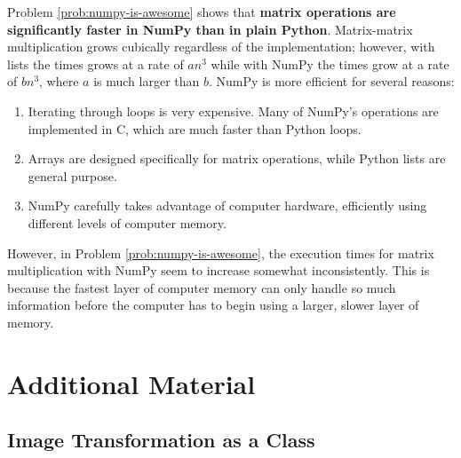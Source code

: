 \begin{info} %
Problem \ref{prob:numpy-is-awesome} shows that \textbf{matrix  operations are significantly faster in NumPy than in plain Python}.
Matrix-matrix multiplication grows cubically regardless of the implementation; however, with lists the times grows at a rate of $an^3$ while with NumPy the times grow at a rate of $bn^3$, where $a$ is much larger than $b$.
NumPy is more efficient for several reasons:
\begin{enumerate}
    \item Iterating through loops is very expensive.
    Many of NumPy's operations are implemented in C, which are much faster than Python loops.
    \item Arrays are designed specifically for matrix operations, while Python lists are general purpose.
    \item NumPy carefully takes advantage of computer hardware, efficiently using different levels of computer memory.
\end{enumerate}

However, in Problem \ref{prob:numpy-is-awesome}, the execution times for matrix multiplication with NumPy seem to increase somewhat inconsistently.
This is because the fastest layer of computer memory can only handle so much information before the computer has to begin using a larger, slower layer of memory.

\end{info}

\newpage

\section*{Additional Material} %

\subsection*{Image Transformation as a Class} %


